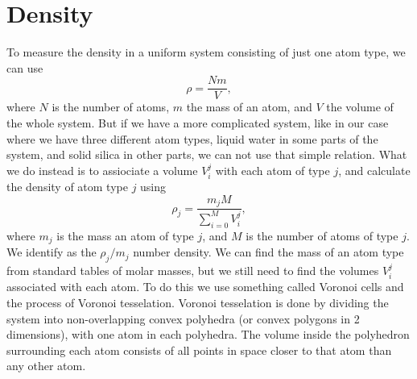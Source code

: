 \section{Density}
To measure the density in a uniform system consisting of just one atom type, we can use
\[
    \rho = \frac{Nm}{V},
\]
where $N$ is the number of atoms, $m$ the mass of an atom, and $V$ the volume of the whole system. But if we have a more complicated system, like in our case where we have three different atom types, liquid water in some parts of the system, and solid silica in other parts, we can not use that simple relation. What we do instead is to assiociate a volume $V_i^j$ with each atom of type $j$, and calculate the density of atom type $j$ using
\[
    \rho_j = \dfrac{m_jM}{\sum_{i=0}^M V_i^j},
\]
where $m_j$ is the mass an atom of type $j$, and $M$ is the number of atoms of type $j$. We identify as the $\rho_j/m_j$ number density. We can find the mass of an atom type from standard tables of molar masses, but we still need to find the volumes $V_i^j$ associated with each atom. To do this we use something called Voronoi cells and the process of Voronoi tesselation. Voronoi tesselation is done by dividing the system into non-overlapping convex polyhedra (or convex polygons in 2 dimensions), with one atom in each polyhedra. The volume inside the polyhedron surrounding each atom consists of all points in space closer to that atom than any other atom. 

